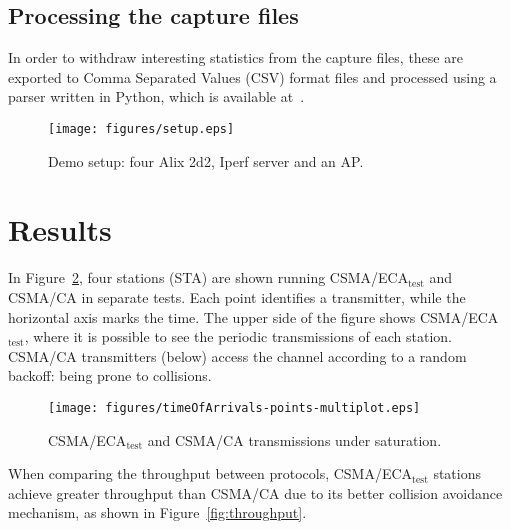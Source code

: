 \documentclass[conference]{IEEEtran}
\begin{document}
	\subsection{Processing the capture files}
	In order to withdraw interesting statistics from the capture files, these are exported to Comma Separated Values (CSV) format files and processed using a parser written in Python, which is available at~\cite{pcapParser}.
	
	\begin{figure}[htbp]
		\centering
		\texttt{[image: figures/setup.eps]}
		\caption{Demo setup: four Alix 2d2, Iperf server and an AP.}
		\label{fig:setup}
	\end{figure}
	
\section{Results}\label{results}
In Figure~\ref{fig:ECA-test}, four stations (STA) are shown running CSMA/ECA$_{\text{test}}$ and CSMA/CA in separate tests. Each point identifies a transmitter, while the horizontal axis marks the time. The upper side of the figure shows CSMA/ECA$_{\text{test}}$, where it is possible to see the periodic transmissions of each station. CSMA/CA transmitters (below) access the channel according to a random backoff: being prone to collisions. 


	\begin{figure}[htbp]
		\centering
		\texttt{[image: figures/timeOfArrivals-points-multiplot.eps]}
		\caption{CSMA/ECA$_{\text{test}}$ and CSMA/CA transmissions under saturation.}
		\label{fig:ECA-test}
	\end{figure}

When comparing the throughput between protocols, CSMA/ECA$_{\text{test}}$ stations achieve greater throughput than CSMA/CA due to its better collision avoidance mechanism, as shown in Figure~\ref{fig:throughput}.
\end{document}
